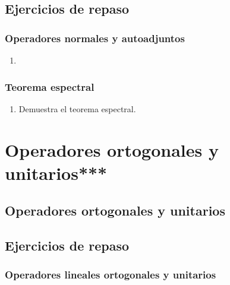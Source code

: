 \documentclass[12pt,dvipsnames]{article}
\begin{document}
\subsection{Ejercicios de repaso}

\subsubsection{Operadores normales y autoadjuntos}
\begin{enumerate}
    \item
\end{enumerate}

\subsubsection{Teorema espectral}

\begin{enumerate}
    \item Demuestra el teorema espectral.
\end{enumerate}


\newpage
\section{Operadores ortogonales y unitarios***} \label{Sec:16} 

\subsection{Operadores ortogonales y unitarios}



\subsection{Ejercicios de repaso}

\subsubsection{Operadores lineales ortogonales y unitarios}
\end{document}
